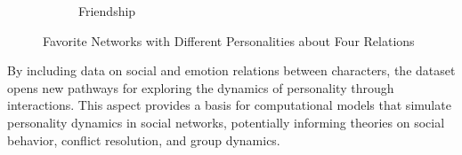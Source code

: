 \begin{figure}[!h]
\begin{subfigure}[b]{0.22\textwidth}
        \caption{Friendship}
        \label{fig:subgraph4}
    \end{subfigure}
    \caption{Favorite Networks with Different Personalities about Four Relations}
    \label{fig:networks}
\end{figure}

By including data on social and emotion relations between characters, the dataset opens new pathways for exploring the dynamics of personality through interactions. This aspect provides a basis for computational models that simulate personality dynamics in social networks, potentially informing theories on social behavior, conflict resolution, and group dynamics.
